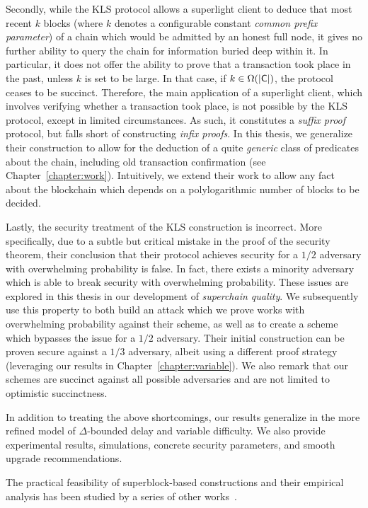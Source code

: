 Secondly, while the KLS protocol allows a superlight client to deduce that most
recent $k$ blocks (where $k$ denotes a configurable constant \emph{common prefix
parameter}) of a chain which would be admitted by an honest full node, it gives
no further ability to query the chain for information buried deep within it. In
particular, it does not offer the ability to prove that a transaction took place
in the past, unless $k$ is set to be large. In that case, if
$k \in \Omega(|\mathsf{C}|)$, the protocol ceases to be succinct. Therefore, the
main application of a superlight client, which involves verifying whether a
transaction took place, is not possible by the KLS protocol, except in limited
circumstances. As such, it constitutes a \emph{suffix proof} protocol, but falls
short of constructing \emph{infix proofs}. In this thesis, we generalize their
construction to allow for the deduction of a quite \emph{generic} class of
predicates about the chain, including old transaction confirmation (see
Chapter~\ref{chapter:work}). Intuitively,
we extend their work to allow any fact about the blockchain which depends on a
polylogarithmic number of blocks to be decided.

Lastly, the security treatment of the KLS construction is incorrect. More
specifically, due to a subtle but critical mistake in the proof of the security
theorem, their conclusion that their protocol achieves security for a $1/2$
adversary with overwhelming probability is false. In fact, there exists a
minority adversary which is able to break security with overwhelming
probability. These issues are explored in this thesis in our development of
\emph{superchain quality}. We subsequently use this property to both build an
attack which we prove works with overwhelming probability against their scheme,
as well as to create a scheme which bypasses the issue for a $1/2$ adversary.
Their initial construction can be proven secure against a $1/3$ adversary,
albeit using a different proof strategy (leveraging our results in
Chapter~\ref{chapter:variable}). We also remark that our schemes are succinct
against all possible adversaries and are not limited to optimistic succinctness.

In addition to treating the above shortcomings, our results generalize in the
more refined model of $\Delta$-bounded delay and variable difficulty. We also
provide experimental results, simulations, concrete security parameters, and
smooth upgrade recommendations.

The practical feasibility of superblock-based constructions and their empirical
analysis has been studied by a series of other
works~\cite{gtklocker,superblocks}.

